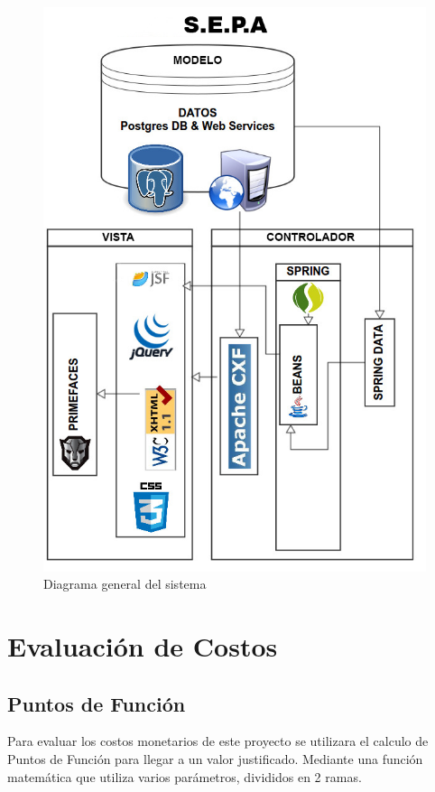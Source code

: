 \documentclass[a4paper,12pt,openany,oneside]{book}
\begin{document}
\begin{figure}[!hbp]
\begin{center}
\includegraphics[scale=0.6,angle=0]{images/diagrama.jpg}
\caption{Diagrama general del sistema}

\end{center}
\end{figure}
\chapter{Evaluación de Costos}
\section{Puntos de Función}
Para evaluar los costos monetarios de este proyecto se utilizara el calculo de Puntos de Función para llegar a un valor justificado. Mediante una función matemática que utiliza varios parámetros, divididos en 2 ramas.
\end{document}
